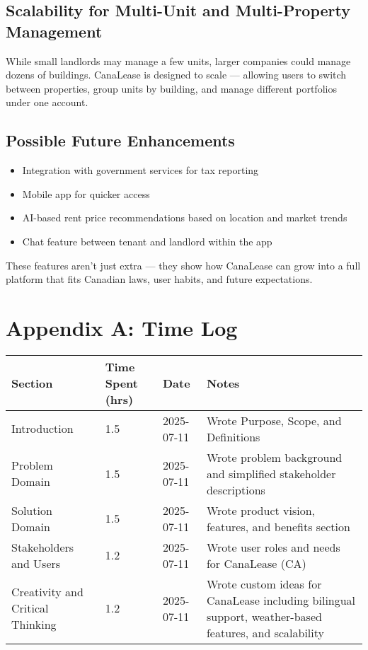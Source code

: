 \documentclass[12pt]{article}
\begin{document}
\subsection{Scalability for Multi-Unit and Multi-Property Management}
While small landlords may manage a few units, larger companies could manage dozens of buildings. CanaLease is designed to scale — allowing users to switch between properties, group units by building, and manage different portfolios under one account.

\subsection{Possible Future Enhancements}
\begin{itemize}
    \item Integration with government services for tax reporting
    \item Mobile app for quicker access
    \item AI-based rent price recommendations based on location and market trends
    \item Chat feature between tenant and landlord within the app
\end{itemize}

These features aren’t just extra — they show how CanaLease can grow into a full platform that fits Canadian laws, user habits, and future expectations.

\newpage
\appendix
\section*{Appendix A: Time Log}

\begin{longtable}{|p{}|p{}|p{}|p{}|}
\hline
\textbf{Section} & \textbf{Time Spent (hrs)} & \textbf{Date} & \textbf{Notes} \\
\hline
Introduction & 1.5 & 2025-07-11 & Wrote Purpose, Scope, and Definitions \\
Problem Domain & 1.5 & 2025-07-11 & Wrote problem background and simplified stakeholder descriptions \\
Solution Domain & 1.5 & 2025-07-11 & Wrote product vision, features, and benefits section \\
Stakeholders and Users & 1.2 & 2025-07-11 & Wrote user roles and needs for CanaLease (CA) \\
Creativity and Critical Thinking & 1.2 & 2025-07-11 & Wrote custom ideas for CanaLease including bilingual support, weather-based features, and scalability \\
\hline
\end{longtable}
\end{document}
